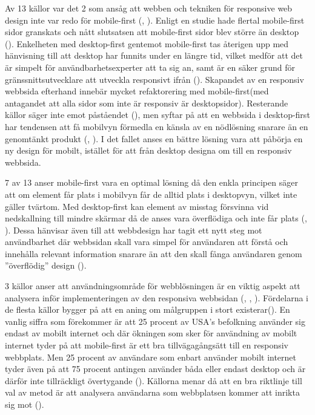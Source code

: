 \documentclass[11pt]{article}
\begin{document}
Av 13 källor var det 2 som ansåg att webben och tekniken för responsive web design inte var redo för mobile-first (\cite{cloudfour}, \cite{armstrong}). Enligt en studie hade flertal mobile-first sidor granskats och nått slutsatsen att mobile-first sidor blev större än desktop (\cite{cloudfour}). Enkelheten med desktop-first gentemot mobile-first tas återigen upp med hänvisning till att desktop har funnits under en längre tid, vilket medför att det är simpelt för användbarhetsexperter att ta sig an, samt är en säker grund för gränssnittsutvecklare att utveckla responsivt ifrån (\cite{armstrong}). Skapandet av en responsiv webbsida efterhand innebär mycket refaktorering med mobile-first(med antagandet att alla sidor som inte är responsiv är desktopsidor). Resterande källor säger inte emot påståendet (\cite{neocreo}), men syftar på att en webbsida i desktop-first har tendensen att få mobilvyn förmedla en känsla av en nödlösning snarare än en genomtänkt produkt (\cite{designshack}, \cite{othermedia}). I det fallet anses en bättre lösning vara att påbörja en ny design för mobilt, istället för att från desktop designa om till en responsiv webbsida.
 
7 av 13 anser mobile-first vara en optimal lösning då den enkla principen säger att om element får plats i mobilvyn får de alltid plats i desktopvyn, vilket inte gäller tvärtom. Med desktop-first kan element av misstag försvinna vid nedskallning till mindre skärmar då de anses vara överflödiga och inte får plats (\cite{blogskent}, \cite{responsivedesign}). Dessa hänvisar även till att webbdesign har tagit ett nytt steg mot användbarhet där webbsidan skall vara simpel för användaren att förstå och innehålla relevant information snarare än att den skall fånga användaren genom ”överflödig” design (\cite{blogskent}). 

3 källor anser att användningsområde för webblösningen är en viktig aspekt att analysera inför implementeringen av den responsiva webbsidan (\cite{neocreo}, \cite{marcuspope}, \cite{designshack}). Fördelarna i de flesta källor bygger på att en aning om målgruppen i stort existerar(\cite{zurbword}). En vanlig siffra som förekommer är att 25 procent av USA’s befolkning använder sig endast av mobilt internet och där ökningen som sker för användning av mobilt internet tyder på att mobile-first är ett bra tillvägagångsätt till en responsiv webbplats.  Men 25 procent av användare som enbart använder mobilt internet tyder även på att 75 procent antingen använder båda eller endast desktop och är därför inte tillräckligt övertygande (\cite{marcuspope}). Källorna menar då att en bra riktlinje till val av metod är att analysera användarna som webbplatsen kommer att inrikta sig mot (\cite{neocreo}). 
\newpage
\end{document}
